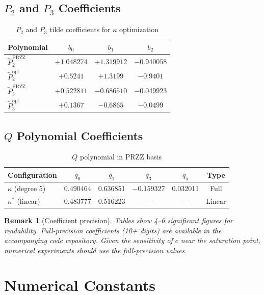 \documentclass[11pt]{article}
\newtheorem{remark}{Remark}
\begin{document}
\subsection{$P_2$ and $P_3$ Coefficients}

\begin{table}[h]
\centering
\caption{$P_2$ and $P_3$ tilde coefficients for $\kappa$ optimization}
\begin{tabular}{lccc}
\toprule
Polynomial & $b_0$ & $b_1$ & $b_2$ \\
\midrule
$\tilde{P}_2^{\text{PRZZ}}$ & $+1.048274$ & $+1.319912$ & $-0.940058$ \\
$\tilde{P}_2^{\text{opt}}$ & $+0.5241$ & $+1.3199$ & $-0.9401$ \\
\midrule
$\tilde{P}_3^{\text{PRZZ}}$ & $+0.522811$ & $-0.686510$ & $-0.049923$ \\
$\tilde{P}_3^{\text{opt}}$ & $+0.1367$ & $-0.6865$ & $-0.0499$ \\
\bottomrule
\end{tabular}
\end{table}

\subsection{$Q$ Polynomial Coefficients}

\begin{table}[h]
\centering
\caption{$Q$ polynomial in PRZZ basis}
\begin{tabular}{lccccc}
\toprule
Configuration & $q_0$ & $q_1$ & $q_3$ & $q_5$ & Type \\
\midrule
$\kappa$ (degree 5) & 0.490464 & 0.636851 & $-0.159327$ & 0.032011 & Full \\
$\kappa^*$ (linear) & 0.483777 & 0.516223 & --- & --- & Linear \\
\bottomrule
\end{tabular}
\end{table}

\begin{remark}[Coefficient precision]
Tables show 4--6 significant figures for readability. Full-precision coefficients (10+ digits) are available in the accompanying code repository. Given the sensitivity of $c$ near the saturation point, numerical experiments should use the full-precision values.
\end{remark}

\section{Numerical Constants}
\label{app:constants}
\end{document}
